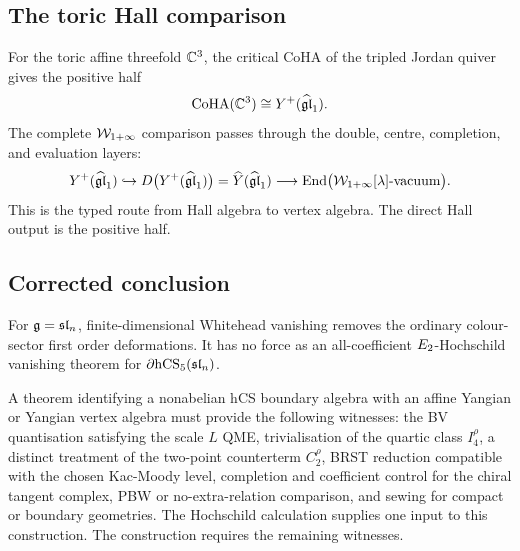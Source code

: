 \subsection{The toric Hall comparison}

For the toric affine threefold $\mathbb{C}^3$, the critical CoHA of the tripled
Jordan quiver gives the positive half
\[
  \operatorname{CoHA}(\mathbb{C}^3)\cong Y^{+}(\widehat{\mathfrak{gl}}_1).
\]
The complete $\mathcal{W}_{1+\infty}$ comparison passes through the double, centre,
completion, and evaluation layers:
\[
  Y^{+}(\widehat{\mathfrak{gl}}_1)
  \hookrightarrow
  D\bigl(Y^{+}(\widehat{\mathfrak{gl}}_1)\bigr)
  =
  \widehat{Y}(\widehat{\mathfrak{gl}}_1)
  \longrightarrow
  \operatorname{End}\bigl(\mathcal{W}_{1+\infty}[\lambda]\text{-vacuum}\bigr).
\]
This is the typed route from Hall algebra to vertex algebra. The direct
Hall output is the positive half.

\subsection{Corrected conclusion}

For $\mathfrak{g}=\mathfrak{sl}_n$, finite-dimensional Whitehead vanishing removes the
ordinary colour-sector first order deformations. It has no force as an
all-coefficient $E_2$-Hochschild vanishing theorem for
$\partial\mathrm{hCS}_5(\mathfrak{sl}_n)$.

A theorem identifying a nonabelian hCS boundary algebra with an affine
Yangian or Yangian vertex algebra must provide the following witnesses:
the BV quantisation satisfying the scale $L$ QME, trivialisation of the
quartic class $I_4^\rho$,
a distinct treatment of the two-point counterterm $C_2^\rho$,
BRST reduction compatible with the chosen Kac-Moody level,
completion and coefficient control for the chiral tangent complex, PBW
or no-extra-relation comparison, and sewing for compact or boundary
geometries. The Hochschild calculation supplies one input to this
construction. The construction requires the remaining witnesses.

